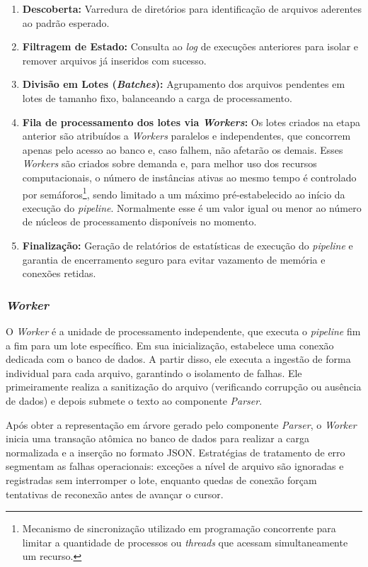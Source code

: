 \begin{enumerate}
    \item \textbf{Descoberta:} Varredura de diretórios para identificação de
    arquivos aderentes ao padrão esperado.
    \item \textbf{Filtragem de Estado:} Consulta ao \textit{log} de execuções
    anteriores para isolar e remover arquivos já inseridos com sucesso.
    \item \textbf{Divisão em Lotes (\textit{Batches}):} Agrupamento dos
    arquivos pendentes em lotes de tamanho fixo, balanceando a carga de
    processamento.
    \item \textbf{Fila de processamento dos lotes via \textit{Workers}:} 
    Os lotes criados na etapa anterior são atribuídos a \textit{Workers}
    paralelos e independentes, que concorrem apenas pelo acesso ao banco e,
    caso falhem, não afetarão os demais.
    Esses \textit{Workers} são criados sobre demanda e, para melhor uso dos
    recursos computacionais, o número de instâncias ativas ao mesmo tempo é
    controlado por semáforos\footnote{Mecanismo de sincronização utilizado em
    programação concorrente para limitar a quantidade de processos ou
    \textit{threads} que acessam simultaneamente um recurso.}, sendo limitado
    a um máximo pré-estabelecido ao início da execução do \textit{pipeline}.
    Normalmente esse é um valor igual ou menor ao número de núcleos de
    processamento disponíveis no momento.
    \item \textbf{Finalização:} Geração de relatórios de estatísticas de
    execução do \textit{pipeline} e garantia de encerramento seguro para evitar
    vazamento de memória e conexões retidas.
\end{enumerate}

\subsubsection{\textit{Worker}}
O \textit{Worker} é a unidade de processamento independente, que executa o
\textit{pipeline} fim a fim para um lote específico. Em sua inicialização,
estabelece uma conexão dedicada com o banco de dados. A partir disso, ele
executa a ingestão de forma individual para cada arquivo, garantindo o
isolamento de falhas. Ele primeiramente realiza a sanitização do arquivo
(verificando corrupção ou ausência de dados) e depois submete o texto ao
componente \textit{Parser}.

Após obter a representação em árvore gerado pelo componente \textit{Parser},
o \textit{Worker} inicia uma transação atômica no banco de dados para realizar
a carga normalizada e a inserção no formato JSON. Estratégias de tratamento de
erro segmentam as falhas operacionais: exceções a nível de arquivo são ignoradas
e registradas sem interromper o lote, enquanto quedas de conexão forçam
tentativas de reconexão antes de avançar o cursor.

